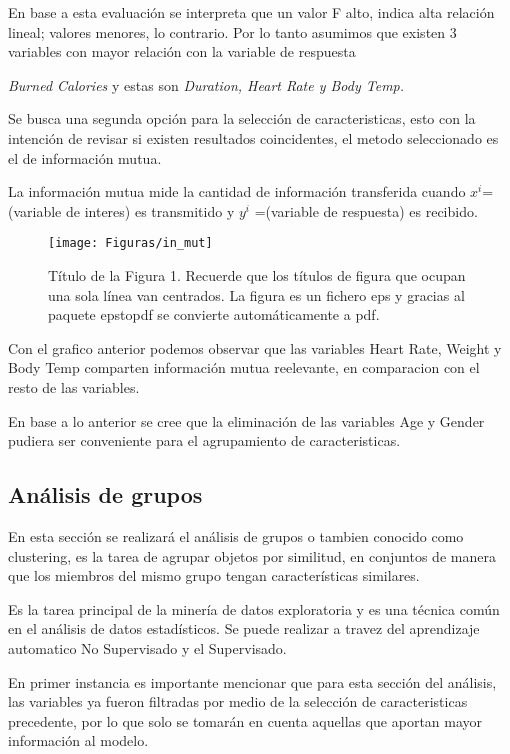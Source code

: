 \documentclass[5p,times,authoryear]{sciarticle}
\begin{document}
\begin{multicols}{2}
En base a esta evaluación se  interpreta que un valor F alto, indica alta relación lineal; valores menores, lo contrario. Por lo tanto asumimos que existen 3 variables con mayor relación con la variable de respuesta {\emph {Burned Calories} y estas son \emph{ \emph {Duration, Heart Rate y Body Temp.}}


Se busca una segunda opción para la selección de caracteristicas, esto con la intención de revisar si existen resultados coincidentes, el metodo seleccionado es el de información mutua.

La información mutua mide la cantidad de información transferida cuando ${x}^{i}$= (variable de interes) es transmitido y ${y}^{i}$ =(variable de respuesta) es recibido.

\begin{figure}[H]
\centering
  \texttt{[image: Figuras/in\_mut]}\\
  \caption{Título de la Figura 1. Recuerde que los títulos de figura que ocupan una sola línea van centrados. La figura es un fichero eps y gracias al paquete epstopdf se convierte automáticamente a pdf.}\label{fig1}
\end{figure}

Con el grafico anterior podemos observar que las variables Heart Rate, Weight y Body Temp comparten información mutua reelevante, en comparacion con el resto de las variables.



En base a lo anterior se cree que la eliminación de las variables Age y Gender pudiera ser conveniente para el agrupamiento de caracteristicas.

\subsection{Análisis de grupos}

En esta sección se realizará el análisis de grupos o tambien conocido como clustering, es la tarea de agrupar objetos por similitud, en conjuntos de manera que los miembros del mismo grupo tengan características similares. 

Es la tarea principal de la minería de datos exploratoria y es una técnica común en el análisis de datos estadísticos. Se puede realizar a travez del aprendizaje automatico No Supervisado y el Supervisado.

En primer instancia es importante mencionar que para esta sección del análisis, las variables ya fueron filtradas por medio de la selección de caracteristicas precedente, por lo que solo se tomarán en cuenta aquellas que aportan mayor información al modelo.\\

}
\end{multicols}
\end{document}
